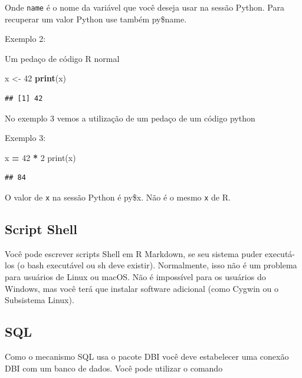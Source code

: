 \documentclass[
]{book}
\newenvironment{Shaded}{\begin{snugshade}}{\end{snugshade}}
\newcommand{\BuiltInTok}[1]{#1}
\newcommand{\DecValTok}[1]{\textcolor[rgb]{0.00,0.00,0.81}{#1}}
\newcommand{\KeywordTok}[1]{\textcolor[rgb]{0.13,0.29,0.53}{\textbf{#1}}}
\newcommand{\NormalTok}[1]{#1}
\newcommand{\OperatorTok}[1]{\textcolor[rgb]{0.81,0.36,0.00}{\textbf{#1}}}
\newcommand{\StringTok}[1]{\textcolor[rgb]{0.31,0.60,0.02}{#1}}
\begin{document}
Onde \texttt{name} é o nome da variável que você deseja usar na sessão Python. Para recuperar um valor Python use também py\$name.

Exemplo 2:

Um pedaço de código R normal

\begin{Shaded}
\begin{Highlighting}[]
\NormalTok{x \textless{}{-}}\StringTok{ }\DecValTok{42}
\KeywordTok{print}\NormalTok{(x)}
\end{Highlighting}
\end{Shaded}

\begin{verbatim}
## [1] 42
\end{verbatim}

No exemplo 3 vemos a utilização de um pedaço de um código python

Exemplo 3:

\begin{Shaded}
\begin{Highlighting}[]
\NormalTok{x }\OperatorTok{=} \DecValTok{42} \OperatorTok{*} \DecValTok{2}
\BuiltInTok{print}\NormalTok{(x)}
\end{Highlighting}
\end{Shaded}

\begin{verbatim}
## 84
\end{verbatim}

O valor de \texttt{x} na sessão Python é py\$x. Não é o mesmo \texttt{x} de R.

\hypertarget{script-shell}{%
\subsection{Script Shell}\label{script-shell}}

Você pode escrever scripts Shell em R Markdown, se seu sistema puder executá-los (o bash executável ou sh deve existir). Normalmente, isso não é um problema para usuários de Linux ou macOS. Não é impossível para os usuários do Windows, mas você terá que instalar software adicional (como Cygwin ou o Subsistema Linux).

\hypertarget{sql}{%
\subsection{SQL}\label{sql}}

Como o mecanismo SQL usa o pacote DBI você deve estabelecer uma conexão DBI com um banco de dados. Você pode utilizar o comando
\end{document}
